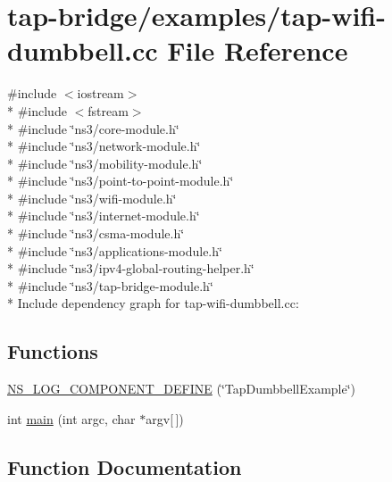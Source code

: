 \hypertarget{tap-wifi-dumbbell_8cc}{}\section{tap-\/bridge/examples/tap-\/wifi-\/dumbbell.cc File Reference}
\label{tap-wifi-dumbbell_8cc}
{\ttfamily \#include $<$iostream$>$}\\*
{\ttfamily \#include $<$fstream$>$}\\*
{\ttfamily \#include \char`\"{}ns3/core-\/module.\+h\char`\"{}}\\*
{\ttfamily \#include \char`\"{}ns3/network-\/module.\+h\char`\"{}}\\*
{\ttfamily \#include \char`\"{}ns3/mobility-\/module.\+h\char`\"{}}\\*
{\ttfamily \#include \char`\"{}ns3/point-\/to-\/point-\/module.\+h\char`\"{}}\\*
{\ttfamily \#include \char`\"{}ns3/wifi-\/module.\+h\char`\"{}}\\*
{\ttfamily \#include \char`\"{}ns3/internet-\/module.\+h\char`\"{}}\\*
{\ttfamily \#include \char`\"{}ns3/csma-\/module.\+h\char`\"{}}\\*
{\ttfamily \#include \char`\"{}ns3/applications-\/module.\+h\char`\"{}}\\*
{\ttfamily \#include \char`\"{}ns3/ipv4-\/global-\/routing-\/helper.\+h\char`\"{}}\\*
{\ttfamily \#include \char`\"{}ns3/tap-\/bridge-\/module.\+h\char`\"{}}\\*
Include dependency graph for tap-\/wifi-\/dumbbell.cc\+:
\subsection*{Functions}
\begin{DoxyCompactItemize}
\item 
\hyperlink{tap-wifi-dumbbell_8cc_a8fd84ffcdfa7d857f4d68b99d3bffb39}{N\+S\+\_\+\+L\+O\+G\+\_\+\+C\+O\+M\+P\+O\+N\+E\+N\+T\+\_\+\+D\+E\+F\+I\+NE} (\char`\"{}Tap\+Dumbbell\+Example\char`\"{})
\item 
int \hyperlink{tap-wifi-dumbbell_8cc_a0ddf1224851353fc92bfbff6f499fa97}{main} (int argc, char $\ast$argv\mbox{[}$\,$\mbox{]})
\end{DoxyCompactItemize}


\subsection{Function Documentation}
